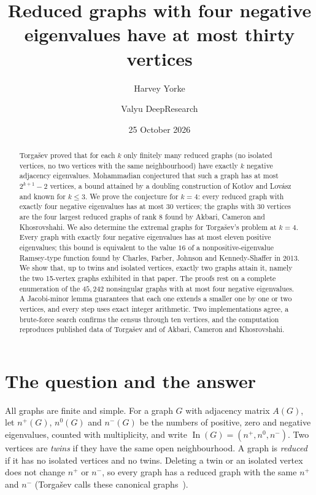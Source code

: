 \documentclass[11pt]{amsart}
\title{Reduced graphs with four negative eigenvalues have at most thirty vertices}
\author{Harvey Yorke}
\author{Valyu DeepResearch}
\date{25 October 2026}
\theoremstyle{definition}
\theoremstyle{remark}
\newcommand{\In}{\operatorname{In}}
\begin{document}
\raggedbottom
\begin{abstract}
Torga\v{s}ev proved that for each $k$ only finitely many reduced graphs (no isolated vertices, no two vertices with the same neighbourhood) have exactly $k$ negative adjacency eigenvalues. Mohammadian conjectured that such a graph has at most $2^{k+1}-2$ vertices, a bound attained by a doubling construction of Kotlov and Lov\'asz and known for $k\le3$. We prove the conjecture for $k=4$: every reduced graph with exactly four negative eigenvalues has at most $30$ vertices; the graphs with $30$ vertices are the four largest reduced graphs of rank $8$ found by Akbari, Cameron and Khosrovshahi. We also determine the extremal graphs for Torga\v{s}ev's problem at $k=4$. Every graph with exactly four negative eigenvalues has at most eleven positive eigenvalues; this bound is equivalent to the value $16$ of a nonpositive-eigenvalue Ramsey-type function found by Charles, Farber, Johnson and Kennedy-Shaffer in 2013. We show that, up to twins and isolated vertices, exactly two graphs attain it, namely the two 15-vertex graphs exhibited in that paper. The proofs rest on a complete enumeration of the $45{,}242$ nonsingular graphs with at most four negative eigenvalues. A Jacobi-minor lemma guarantees that each one extends a smaller one by one or two vertices, and every step uses exact integer arithmetic. Two implementations agree, a brute-force search confirms the census through ten vertices, and the computation reproduces published data of Torga\v{s}ev and of Akbari, Cameron and Khosrovshahi.
\end{abstract}
\maketitle

\section{The question and the answer}

All graphs are finite and simple. For a graph $G$ with adjacency matrix $A(G)$, let $n^+(G)$, $n^0(G)$ and $n^-(G)$ be the numbers of positive, zero and negative eigenvalues, counted with multiplicity, and write $\In(G)=(n^+,n^0,n^-)$. Two vertices are \emph{twins} if they have the same open neighbourhood. A graph is \emph{reduced} if it has no isolated vertices and no twins. Deleting a twin or an isolated vertex does not change $n^+$ or $n^-$, so every graph has a reduced graph with the same $n^+$ and $n^-$ (Torga\v{s}ev calls these canonical graphs~\cite{Torgasev1992}).
\end{document}
